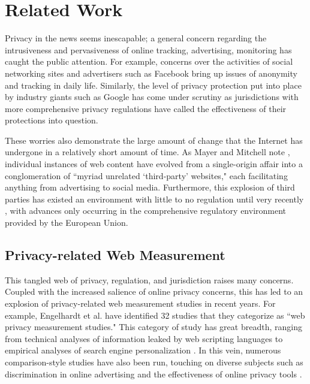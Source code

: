 \documentclass[journal]{IEEEtran}
\begin{document}
\section{Related Work}
Privacy in the news seems inescapable; a general concern regarding the intrusiveness and pervasiveness of online tracking, advertising, monitoring has caught the public attention. For example, concerns over the activities of social networking sites and advertisers such as Facebook \cite{wsj_fb} bring up issues of anonymity and tracking in daily life. Similarly, the level of privacy protection put into place by industry giants such as Google has come under scrutiny \cite{Google_EU_marketingland} as jurisdictions with more comprehensive privacy regulations have called the effectiveness of their protections into question.

These worries also demonstrate the large amount of change that the Internet has undergone in a relatively short amount of time. As Mayer and Mitchell note \cite{Mayer_Mitchell}, individual instances of web content have evolved from a single-origin affair into a conglomeration of  ``myriad unrelated  `third-party' websites," each facilitating anything from advertising to social media. Furthermore, this explosion of third parties has existed an environment with little to no regulation until very recently \cite{Mayer_Mitchell}, with advances only occurring in the comprehensive regulatory environment provided by the European Union.  

\subsection{Privacy-related Web Measurement}
This tangled web of privacy, regulation, and jurisdiction raises many concerns. Coupled with the increased salience of online privacy concerns, this has led to an explosion of privacy-related web measurement studies in recent years. For example, Engelhardt et al. \cite{openwpm_article} have identified 32 studies that they categorize as ``web privacy measurement studies." This category of study has great breadth, ranging from technical analyses of information leaked by web scripting languages \cite{jang} to empirical analyses of search engine personalization \cite{hannak}.  In this vein, numerous comparison-style studies have also been run, touching on diverse subjects such as discrimination in online advertising \cite{sweeney} and the effectiveness of online privacy tools \cite{balebako}.
\end{document}

